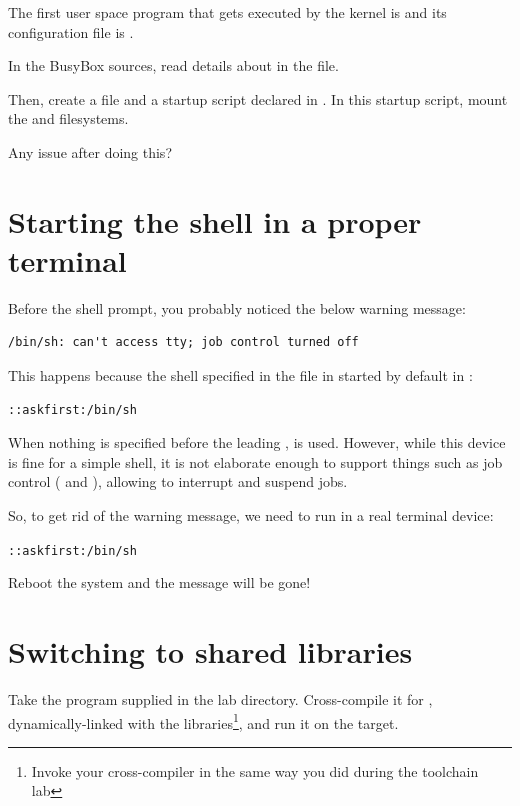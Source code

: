 The first user space program that gets executed by the kernel is
 and its configuration file is .

In the BusyBox sources, read details about  in the
 file.

Then, create a  file and a 
startup script declared in . In this startup
script, mount the  and  filesystems.

Any issue after doing this?

\section{Starting the shell in a proper terminal}

Before the shell prompt, you probably noticed the below warning message:

\begin{verbatim}
/bin/sh: can't access tty; job control turned off
\end{verbatim}

This happens because the shell specified in the  file
in started by default in :

\begin{verbatim}
::askfirst:/bin/sh
\end{verbatim}

When nothing is specified before the leading \code{::}, 
is used. However, while this device is fine for a simple shell, it is
not elaborate enough to support things such as job control
(\code{[Ctrl][c]} and \code{[Ctrl][z]}), allowing to interrupt and
suspend jobs.

So, to get rid of the warning message, we need  to run
 in a real terminal device:

{\tt \ttyname::askfirst:/bin/sh}

Reboot the system and the message will be gone!

\section{Switching to shared libraries}

Take the  program supplied in the lab 
directory. Cross-compile it for ,
dynamically-linked with the libraries\footnote{Invoke your cross-compiler
in the same way you did during the toolchain lab}, and run it on the target.

